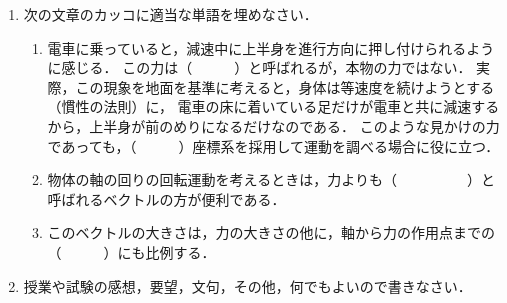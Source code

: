 \documentclass[a4paper,11pt]{ltjsarticle}
\begin{document}
\begin{enumerate}
\clearpage

    \item 次の文章のカッコに適当な単語を埋めなさい．
    
    \begin{enumerate}[label=(\arabic*)]
        \item 電車に乗っていると，減速中に上半身を進行方向に押し付けられるように感じる．
        この力は（　　　）と呼ばれるが，本物の力ではない．
        実際，この現象を地面を基準に考えると，身体は等速度を続けようとする（慣性の法則）に，
        電車の床に着いている足だけが電車と共に減速するから，上半身が前のめりになるだけなのである．
        このような見かけの力であっても，（　　　）座標系を採用して運動を調べる場合に役に立つ．

        \item 物体の軸の回りの回転運動を考えるときは，力よりも（　　　　　）と呼ばれるベクトルの方が便利である．
        \item このベクトルの大きさは，力の大きさの他に，軸から力の作用点までの（　　　）にも比例する．
    \end{enumerate}

\clearpage

    \item 授業や試験の感想，要望，文句，その他，何でもよいので書きなさい．

\end{enumerate}
\end{document}
